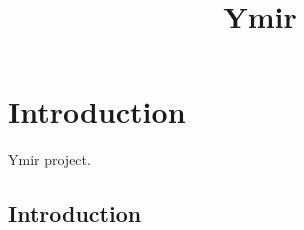 






\title{Ymir}







\maketitle


\tableofcontents

\chapter*{Introduction}\label{chap-intro}

Ymir project.

\section{Introduction}\label{sec-introduction-introduction}
\cite{stacks-project}

\printbibliography
